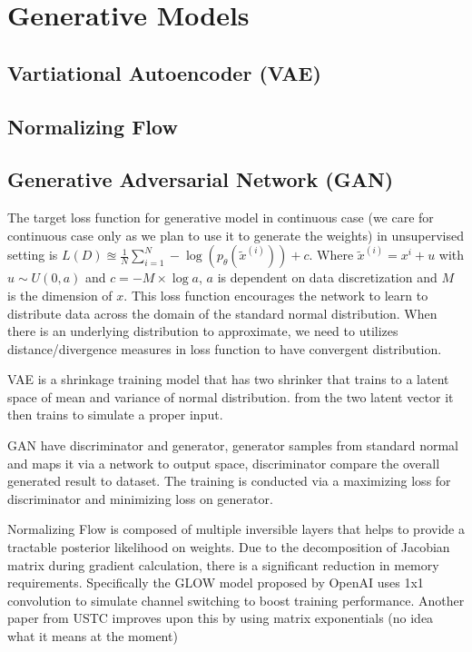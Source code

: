 \documentclass[honours,12pt]{unswthesis}
\numberwithin{equation}{section}
\begin{document}
\section{Generative Models}
\subsection{Vartiational Autoencoder (VAE)}
\subsection{Normalizing Flow}
\subsection{Generative Adversarial Network (GAN) }

The target loss function for generative model in continuous case (we care for continuous case only as we plan to use it to generate the weights) in unsupervised setting is $L(D) \approxeq \frac{1}{N}\sum_{i=1}^N - \log(p_\theta(\tilde{x}^{(i)}))+c$. Where $\tilde{x}^{(i)} = x^{i}+u$ with $u\sim U(0,a)$ and $c=-M\times \log{a}$, $a$ is dependent on data discretization and $M$ is the dimension of $x$. This loss function encourages the network to learn to distribute data across the domain of the standard normal distribution. When there is an underlying distribution to approximate, we need to utilizes distance/divergence measures in loss function to have convergent distribution.

VAE is a shrinkage training model that has two shrinker that trains to a latent space of mean and variance of normal distribution.
from the two latent vector it then trains to simulate a proper input.

GAN have discriminator and generator, generator samples from standard normal and maps it via a network to output space, discriminator compare the overall generated result to dataset. The training is conducted via a maximizing loss for discriminator and minimizing loss on generator.

Normalizing Flow is composed of multiple inversible layers that helps to provide a tractable posterior likelihood on weights. Due to the decomposition of Jacobian matrix during gradient calculation, there is a significant reduction in memory requirements. Specifically the GLOW model proposed by OpenAI \cite{openai2018glow} uses 1x1 convolution to simulate channel switching to boost training performance. Another paper from USTC improves upon this by using matrix exponentials (no idea what it means at the moment)
\end{document}
